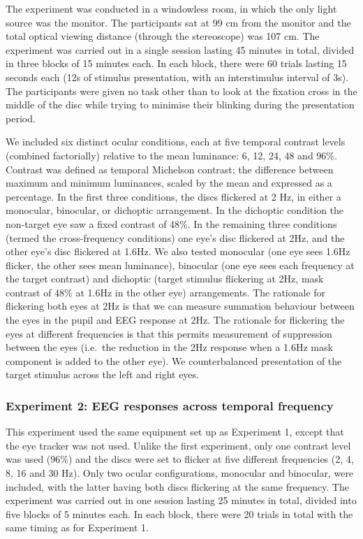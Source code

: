 \documentclass[
]{article}
\begin{document}
The experiment was conducted in a windowless room, in which the only light source was the monitor. The participants sat at 99 cm from the monitor and the total optical viewing distance (through the stereoscope) was 107 cm. The experiment was carried out in a single session lasting 45 minutes in total, divided in three blocks of 15 minutes each. In each block, there were 60 trials lasting 15 seconds each (12s of stimulus presentation, with an interstimulus interval of 3s). The participants were given no task other than to look at the fixation cross in the middle of the disc while trying to minimise their blinking during the presentation period.

We included six distinct ocular conditions, each at five temporal contrast levels (combined factorially) relative to the mean luminance: 6, 12, 24, 48 and 96\%. Contrast was defined as temporal Michelson contrast; the difference between maximum and minimum luminances, scaled by the mean and expressed as a percentage. In the first three conditions, the discs flickered at 2 Hz, in either a monocular, binocular, or dichoptic arrangement. In the dichoptic condition the non-target eye saw a fixed contrast of 48\%. In the remaining three conditions (termed the cross-frequency conditions) one eye's disc flickered at 2Hz, and the other eye's disc flickered at 1.6Hz. We also tested monocular (one eye sees 1.6Hz flicker, the other sees mean luminance), binocular (one eye sees each frequency at the target contrast) and dichoptic (target stimulus flickering at 2Hz, mask contrast of 48\% at 1.6Hz in the other eye) arrangements. The rationale for flickering both eyes at 2Hz is that we can measure summation behaviour between the eyes in the pupil and EEG response at 2Hz. The rationale for flickering the eyes at different frequencies is that this permits measurement of suppression between the eyes (i.e.~the reduction in the 2Hz response when a 1.6Hz mask component is added to the other eye). We counterbalanced presentation of the target stimulus across the left and right eyes.

\hypertarget{experiment-2-eeg-responses-across-temporal-frequency}{%
\subsubsection{Experiment 2: EEG responses across temporal frequency}\label{experiment-2-eeg-responses-across-temporal-frequency}}

This experiment used the same equipment set up as Experiment 1, except that the eye tracker was not used. Unlike the first experiment, only one contrast level was used (96\%) and the discs were set to flicker at five different frequencies (2, 4, 8, 16 and 30 Hz). Only two ocular configurations, monocular and binocular, were included, with the latter having both discs flickering at the same frequency. The experiment was carried out in one session lasting 25 minutes in total, divided into five blocks of 5 minutes each. In each block, there were 20 trials in total with the same timing as for Experiment 1.
\end{document}
